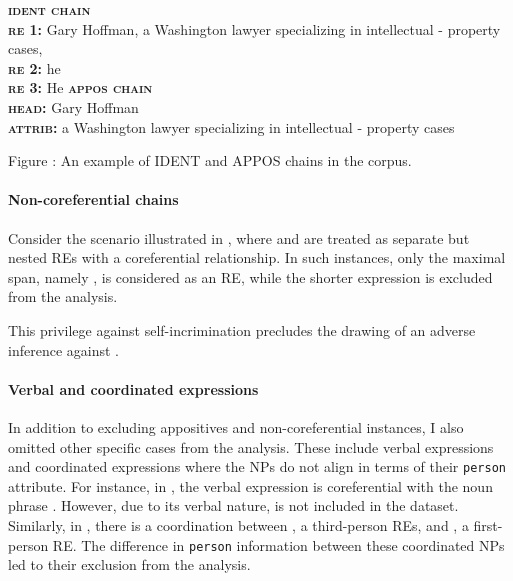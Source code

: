 {
	\begin{tcolorbox}[text width=11cm]
		\textsc{\textbf{ident chain}}\\
		\textsc{\textbf{re 1:}} Gary Hoffman, a Washington lawyer specializing in intellectual - property cases, \\
		\textsc{\textbf{re 2:}} he\\
		\textsc{\textbf{re 3:}} He
		\tcblower
		\textsc{\textbf{appos chain}}\\
		\textsc{\textbf{head:}} Gary Hoffman\\
		\textsc{\textbf{attrib:}}	a Washington lawyer specializing in intellectual - property cases
	\end{tcolorbox}
	\label{fig:chains}
	\begin{center}
		Figure \thefigure: An example of IDENT and APPOS chains in the \wsj corpus.
	\end{center}
}

\paragraph*{Non-coreferential chains}

Consider the scenario illustrated in , where  and  are treated as separate but nested REs with a coreferential relationship. In such instances, only the maximal span, namely , is considered as an RE, while the shorter expression  is excluded from the analysis.



\begin{exe}
	\ex\label{ex:non-referring} This privilege against self-incrimination precludes the drawing of an adverse inference against .
\end{exe}

\paragraph*{Verbal and coordinated expressions}

In addition to excluding appositives and non-coreferential instances, I also omitted other specific cases from the analysis. These include verbal expressions and coordinated expressions where the NPs do not align in terms of their \texttt{person} attribute. For instance, in , the verbal expression  is coreferential with the noun phrase . However, due to its verbal nature,  is not included in the dataset. Similarly, in , there is a coordination between , a third-person REs, and , a first-person RE. The difference in \texttt{person} information between these coordinated NPs led to their exclusion from the analysis.

